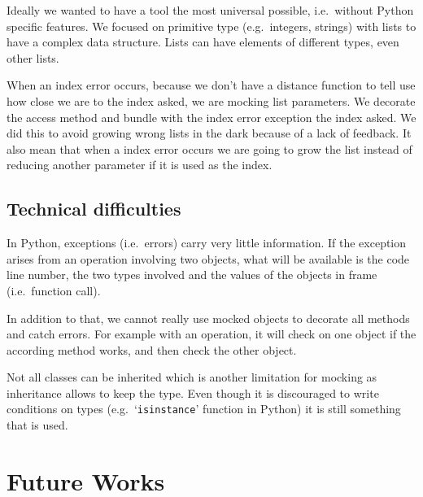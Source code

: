 \documentclass{llncs2e/llncs}
\makeatletter
\def\todo#1{{\color{red}TODO\@: #1}}
\makeatother
\begin{document}
Ideally we wanted to have a tool the most universal possible, i.e.\ without
Python specific features. We focused on primitive type (e.g.\ integers, strings)
with lists to have a complex data structure. Lists can have elements of
different types, even other lists.

When an index error occurs, because we don't have a distance function to tell
use how close we are to the index asked, we are mocking list parameters. We
decorate the access method and bundle with the index error exception the index
asked. We did this to avoid growing wrong lists in the dark because of a lack of
feedback. It also mean that when a index error occurs we are going to grow the
list instead of reducing another parameter if it is used as the index.

\subsection{Technical difficulties}
\label{tech_difficulties}

In Python, exceptions (i.e.\ errors) carry very little information. If the
exception arises from an operation involving two objects, what will be available
is the code line number, the two types involved and the values of the objects in
frame (i.e.\ function call).

In addition to that, we cannot really use mocked objects to decorate all methods
and catch errors. For example with an operation, it will check on one object if
the according method works, and then check the other object.

Not all classes can be inherited which is another limitation for mocking as
inheritance allows to keep the type. Even though it is discouraged to write
conditions on types (e.g.\ `\texttt{isinstance}' function in Python) it is still
something that is used.







\section{Future Works}
\label{futureworks}
\end{document}
